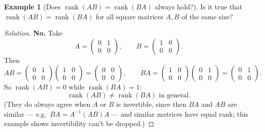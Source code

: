 \documentclass[11pt]{article}
\theoremstyle{definition}
\newtheorem{example}{Example}[section]
\newcommand{\rank}{\operatorname{rank}}
\begin{document}
\begin{example}[Does $\rank(AB)=\rank(BA)$ always hold?]
Is it true that $\rank(AB)=\rank(BA)$ for all square matrices $A,B$ of the same size?
\end{example}
\begin{proof}[Solution]
\textbf{No.} Take
\[
A=\begin{pmatrix}0&1\\0&0\end{pmatrix},\qquad B=\begin{pmatrix}1&0\\0&0\end{pmatrix}.
\]
Then
\[
AB=\begin{pmatrix}0&1\\0&0\end{pmatrix}\begin{pmatrix}1&0\\0&0\end{pmatrix}=\begin{pmatrix}0&0\\0&0\end{pmatrix},\qquad
BA=\begin{pmatrix}1&0\\0&0\end{pmatrix}\begin{pmatrix}0&1\\0&0\end{pmatrix}=\begin{pmatrix}0&1\\0&0\end{pmatrix}.
\]
So $\rank(AB)=0$ while $\rank(BA)=1$:
\[
\boxed{\rank(AB)\ne\rank(BA)\text{ in general}}.
\]
(They do always agree when $A$ or $B$ is invertible, since then $BA$ and $AB$ are similar — e.g.\ $BA=A^{-1}(AB)A$ — and similar matrices have equal rank; this example shows invertibility can't be dropped.)
\end{proof}
\end{document}
